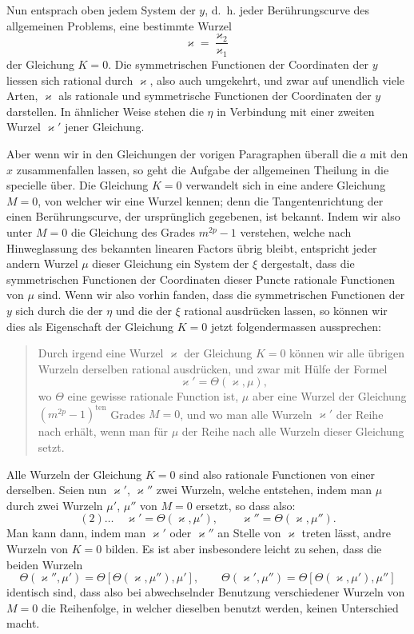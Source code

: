 \documentclass[10pt]{article}
\begin{document}
Nun entsprach oben jedem System der \(y\), d.~h. jeder Berührungscurve des allgemeinen Problems, eine bestimmte Wurzel
\[
\varkappa=\frac{\varkappa_2}{\varkappa_1}
\]
der Gleichung \(K=0\). Die symmetrischen Functionen der Coordinaten der \(y\) liessen sich rational durch \(\varkappa\), also auch umgekehrt, und zwar auf unendlich viele Arten, \(\varkappa\) als rationale und symmetrische Functionen der Coordinaten der \(y\) darstellen. In ähnlicher Weise stehen die \(\eta\) in Verbindung mit einer zweiten Wurzel \(\varkappa'\) jener Gleichung.

Aber wenn wir in den Gleichungen der vorigen Paragraphen überall die \(a\) mit den \(x\) zusammenfallen lassen, so geht die Aufgabe der allgemeinen Theilung in die specielle über. Die Gleichung \(K=0\) verwandelt sich in eine andere Gleichung \(M=0\), von welcher wir eine Wurzel kennen; denn die Tangentenrichtung der einen Berührungscurve, der ursprünglich gegebenen, ist bekannt. Indem wir also unter \(M=0\) die Gleichung des Grades \(m^{2p}-1\) verstehen, welche nach Hinweglassung des bekannten linearen Factors übrig bleibt, entspricht jeder andern Wurzel \(\mu\) dieser Gleichung ein System der \(\xi\) dergestalt, dass die symmetrischen Functionen der Coordinaten dieser Puncte rationale Functionen von \(\mu\) sind. Wenn wir also vorhin fanden, dass die symmetrischen Functionen der \(y\) sich durch die der \(\eta\) und die der \(\xi\) rational ausdrücken lassen, so können wir dies als Eigenschaft der Gleichung \(K=0\) jetzt folgendermassen aussprechen:

\begin{quote}
Durch irgend eine Wurzel \(\varkappa\) der Gleichung \(K=0\) können wir alle übrigen Wurzeln derselben rational ausdrücken, und zwar mit Hülfe der Formel
\[
\varkappa'=\Theta(\varkappa,\mu),
\]
wo \(\Theta\) eine gewisse rationale Function ist, \(\mu\) aber eine Wurzel der Gleichung \((m^{2p}-1)^{\text{ten}}\) Grades \(M=0\), und wo man alle Wurzeln \(\varkappa'\) der Reihe nach erhält, wenn man für \(\mu\) der Reihe nach alle Wurzeln dieser Gleichung setzt.
\end{quote}

Alle Wurzeln der Gleichung \(K=0\) sind also rationale Functionen von einer derselben. Seien nun \(\varkappa'\), \(\varkappa''\) zwei Wurzeln, welche entstehen, indem man \(\mu\) durch zwei Wurzeln \(\mu'\), \(\mu''\) von \(M=0\) ersetzt, so dass also:
\[
(2)\ldots\quad
\varkappa'=\Theta(\varkappa,\mu'),\qquad \varkappa''=\Theta(\varkappa,\mu'').
\]
Man kann dann, indem man \(\varkappa'\) oder \(\varkappa''\) an Stelle von \(\varkappa\) treten lässt, andre Wurzeln von \(K=0\) bilden. Es ist aber insbesondere leicht zu sehen, dass die beiden Wurzeln
\[
\Theta(\varkappa'',\mu')=\Theta[\Theta(\varkappa,\mu''),\mu'],
\qquad
\Theta(\varkappa',\mu'')=\Theta[\Theta(\varkappa,\mu'),\mu'']
\]
identisch sind, dass also bei abwechselnder Benutzung verschiedener Wurzeln von \(M=0\) die Reihenfolge, in welcher dieselben benutzt werden, keinen Unterschied macht.
\end{document}
